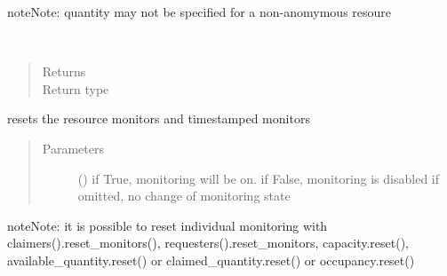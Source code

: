 \documentclass[letterpaper,10pt,english]{sphinxmanual}
\begin{document}
\begin{fulllineitems}
\begin{fulllineitems}
\begin{quote}
\begin{description}
\end{description}\end{quote}

\begin{sphinxadmonition}{note}{Note:}
quantity may not be specified for a non-anomymous resoure
\end{sphinxadmonition}

\end{fulllineitems}


\begin{fulllineitems}
\label{\detokenize{Reference:salabim.Resource.requesters}}~\begin{quote}\begin{description}
\item[{Returns}] \leavevmode
{}

\item[{Return type}] \leavevmode
{\hyperref[\detokenize{Reference:salabim.Queue}]{}}

\end{description}\end{quote}

\end{fulllineitems}


\begin{fulllineitems}
\label{\detokenize{Reference:salabim.Resource.reset_monitors}}
resets the resource monitors  and timestamped monitors
\begin{quote}\begin{description}
\item[{Parameters}] \leavevmode
{} () \textendash{} if True, monitoring will be on. 
if False, monitoring is disabled 
if omitted, no change of monitoring state

\end{description}\end{quote}

\begin{sphinxadmonition}{note}{Note:}
it is possible to reset individual monitoring with
claimers().reset\_monitors(),
requesters().reset\_monitors,
capacity.reset(),
available\_quantity.reset() or
claimed\_quantity.reset() or
occupancy.reset()
\end{sphinxadmonition}


\end{fulllineitems}
\end{fulllineitems}
\end{document}
